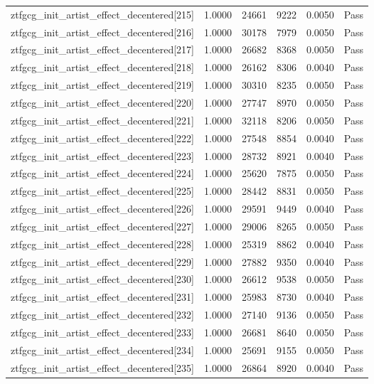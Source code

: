 \begin{table}[htbp]
\begin{tabular}{llrrll}
ztfgcg\_init\_artist\_effect\_decentered[215] & 1.0000 & 24661 & 9222 & 0.0050 & Pass \\
ztfgcg\_init\_artist\_effect\_decentered[216] & 1.0000 & 30178 & 7979 & 0.0050 & Pass \\
ztfgcg\_init\_artist\_effect\_decentered[217] & 1.0000 & 26682 & 8368 & 0.0050 & Pass \\
ztfgcg\_init\_artist\_effect\_decentered[218] & 1.0000 & 26162 & 8306 & 0.0040 & Pass \\
ztfgcg\_init\_artist\_effect\_decentered[219] & 1.0000 & 30310 & 8235 & 0.0050 & Pass \\
ztfgcg\_init\_artist\_effect\_decentered[220] & 1.0000 & 27747 & 8970 & 0.0050 & Pass \\
ztfgcg\_init\_artist\_effect\_decentered[221] & 1.0000 & 32118 & 8206 & 0.0050 & Pass \\
ztfgcg\_init\_artist\_effect\_decentered[222] & 1.0000 & 27548 & 8854 & 0.0040 & Pass \\
ztfgcg\_init\_artist\_effect\_decentered[223] & 1.0000 & 28732 & 8921 & 0.0040 & Pass \\
ztfgcg\_init\_artist\_effect\_decentered[224] & 1.0000 & 25620 & 7875 & 0.0050 & Pass \\
ztfgcg\_init\_artist\_effect\_decentered[225] & 1.0000 & 28442 & 8831 & 0.0050 & Pass \\
ztfgcg\_init\_artist\_effect\_decentered[226] & 1.0000 & 29591 & 9449 & 0.0040 & Pass \\
ztfgcg\_init\_artist\_effect\_decentered[227] & 1.0000 & 29006 & 8265 & 0.0050 & Pass \\
ztfgcg\_init\_artist\_effect\_decentered[228] & 1.0000 & 25319 & 8862 & 0.0040 & Pass \\
ztfgcg\_init\_artist\_effect\_decentered[229] & 1.0000 & 27882 & 9350 & 0.0040 & Pass \\
ztfgcg\_init\_artist\_effect\_decentered[230] & 1.0000 & 26612 & 9538 & 0.0050 & Pass \\
ztfgcg\_init\_artist\_effect\_decentered[231] & 1.0000 & 25983 & 8730 & 0.0040 & Pass \\
ztfgcg\_init\_artist\_effect\_decentered[232] & 1.0000 & 27140 & 9136 & 0.0050 & Pass \\
ztfgcg\_init\_artist\_effect\_decentered[233] & 1.0000 & 26681 & 8640 & 0.0050 & Pass \\
ztfgcg\_init\_artist\_effect\_decentered[234] & 1.0000 & 25691 & 9155 & 0.0050 & Pass \\
ztfgcg\_init\_artist\_effect\_decentered[235] & 1.0000 & 26864 & 8920 & 0.0040 & Pass \\

\end{tabular}
\end{table}
